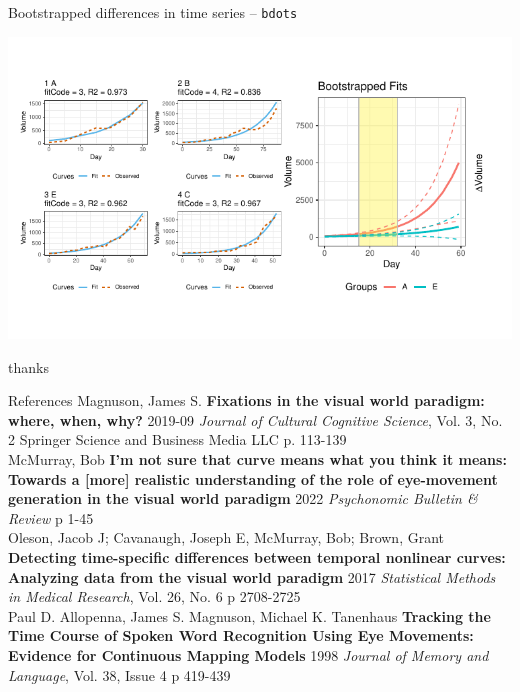 \documentclass{beamer}
\begin{document}
\begin{frame}{Bootstrapped differences in time series -- \texttt{bdots}}
\vspace{-1mm}
\begin{center}
\includegraphics{bdots_examples.pdf}
\end{center}
\end{frame}


\begin{frame}
\centering
thanks
\end{frame}


\begin{frame}{References}\small
Magnuson, James S. \textbf{Fixations in the visual world paradigm: where, when, why?} 2019-09 \textit{Journal of Cultural Cognitive Science}, Vol. 3, No. 2 Springer  Science and Business Media LLC p. 113-139 \newline \\

McMurray, Bob \textbf{I'm not sure that curve means what you think it means: Towards a [more] realistic understanding of the role of eye-movement generation in the visual world paradigm} 2022 \textit{Psychonomic Bulletin \& Review} p 1-45 \newline \\

Oleson, Jacob J; Cavanaugh, Joseph E, McMurray, Bob; Brown, Grant \textbf{Detecting time-specific differences between temporal nonlinear curves: Analyzing data from the visual world paradigm} 2017 \textit{Statistical Methods in Medical Research}, Vol. 26, No. 6 p 2708-2725 \newline \\

Paul D. Allopenna, James S. Magnuson, Michael K. Tanenhaus
\textbf{Tracking the Time Course of Spoken Word Recognition Using Eye Movements: Evidence for Continuous Mapping Models} 1998 \textit{Journal of Memory and Language}, Vol. 38, Issue 4 p 419-439

\end{frame}
\end{document}

